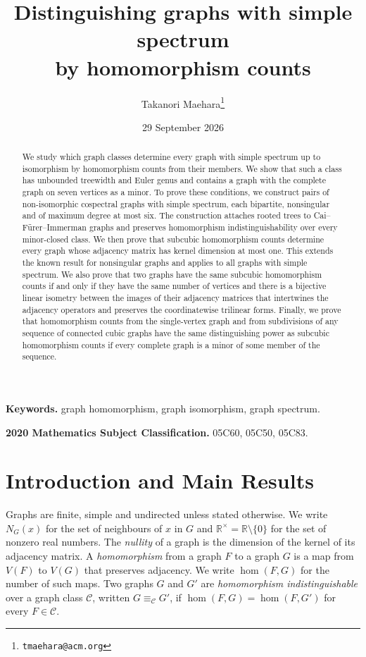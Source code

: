 \documentclass[11pt,a4paper]{article}
\title{Distinguishing graphs with simple spectrum\\by homomorphism counts}
\author{Takanori Maehara\thanks{\texttt{tmaehara@acm.org}}}
\date{29 September 2026}
\theoremstyle{plain}
\theoremstyle{definition}
\newcommand{\R}{\mathbb{R}}
\begin{document}
\maketitle
\begin{abstract}
We study which graph classes determine every graph with simple spectrum
up to isomorphism by homomorphism counts from their members.
We show that such a class has unbounded treewidth and Euler genus and
contains a graph with the complete graph on seven vertices as a minor.
To prove these conditions, we construct pairs of non-isomorphic cospectral
graphs with simple spectrum, each bipartite, nonsingular and of maximum
degree at most six.
The construction attaches rooted trees to Cai--F\"urer--Immerman graphs and
preserves homomorphism indistinguishability over every minor-closed class.
We then prove that subcubic homomorphism counts determine every graph whose
adjacency matrix has kernel dimension at most one.
This extends the known result for nonsingular graphs and applies to all
graphs with simple spectrum.
We also prove that two graphs have the same subcubic homomorphism counts
if and only if they have the same number of vertices and there is a
bijective linear isometry between the images of their adjacency matrices
that intertwines the adjacency operators and preserves the coordinatewise
trilinear forms.
Finally, we prove that homomorphism counts from the single-vertex graph
and from subdivisions of any sequence of connected cubic graphs have
the same distinguishing power as subcubic homomorphism counts if every
complete graph is a minor of some member of the sequence.
\end{abstract}

{\small
\noindent\textbf{Keywords.}
graph homomorphism, graph isomorphism, graph spectrum.
\par\smallskip
\noindent\textbf{2020 Mathematics Subject Classification.}
05C60, 05C50, 05C83.
\par}

\section{Introduction and Main Results}
\label{sec:intro}

Graphs are finite, simple and undirected unless stated otherwise.
We write $N_G(x)$ for the set of neighbours of $x$ in $G$ and
$\R^\times=\R\setminus\{0\}$ for the set of nonzero real numbers.
The \emph{nullity} of a graph is the dimension of the kernel of its
adjacency matrix.
A \emph{homomorphism} from a graph $F$ to a graph $G$
is a map from $V(F)$ to $V(G)$ that preserves adjacency. We write
$\hom(F,G)$ for the number of such maps. Two graphs $G$ and $G'$ are \emph{homomorphism
indistinguishable} over a graph class $\mathcal C$, written
$G\equiv_{\mathcal C}G'$, if
$\hom(F,G)=\hom(F,G')$ for every $F\in\mathcal C$.
\end{document}
